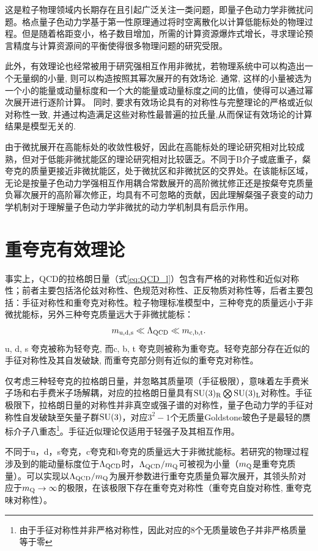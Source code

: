 这是粒子物理领域内长期存在且引起广泛关注一类问题，即量子色动力学非微扰问题。格点量子色动力学基于第一性原理通过将时空离散化以计算低能标处的物理过程。但是随着格距变小，格子数目增加，所需的计算资源爆炸式增长，寻求理论预言精度与计算资源间的平衡使得很多物理问题的研究受限。

此外，有效理论也经常被用于研究强相互作用非微扰，若物理系统中可以构造出一个无量纲的小量, 则可以构造按照其幂次展开的有效场论. 通常, 这样的小量被选为一个小的能量或动量标度和一个大的能量或动量标度之间的比值，使得可以通过幂次展开进行逐阶计算。 同时, 要求有效场论具有的对称性与完整理论的严格或近似对称性一致, 并通过构造满足这些对称性最普遍的拉氏量,从而保证有效场论的计算结果是模型无关的.

由于微扰展开在高能标处的收敛性极好，因此在高能标处的理论研究相对比较成熟，但对于低能非微扰能区的理论研究相对比较匮乏。不同于B介子或底重子，粲夸克的质量更接近非微扰能区，处于微扰区和非微扰区的交界处。在该能标区域，无论是按量子色动力学强相互作用耦合常数展开的高阶微扰修正还是按粲夸克质量负幂次展开的高阶幂次修正，均具有不可忽略的贡献，因此理解粲强子衰变的动力学机制对于理解量子色动力学非微扰的动力学机制具有启示作用。
\section{重夸克有效理论}
事实上，QCD的拉格朗日量（式\eqref{eq:QCD_l}）包含有严格的对称性和近似对称性；前者主要包括洛伦兹对称性、色规范对称性、正反物质对称性等，后者主要包括：手征对称性和重夸克对称性。粒子物理标准模型中，三种夸克的质量远小于非微扰能标，另外三种夸克质量远大于非微扰能标：
\begin{equation}
    m_{\mathrm{u, d, s}} \ll \Lambda_{\mathrm{QCD}} \ll m_{\mathrm{c, b, t}} .
    \end{equation}
 u, d, s 夸克被称为轻夸克, 而c, b, t 夸克则被称为重夸克。轻夸克部分存在近似的手征对称性及其自发破缺, 而重夸克部分则有近似的重夸克对称性。

 仅考虑三种轻夸克的拉格朗日量，并忽略其质量项（手征极限），意味着左手费米子场和右手费米子场解耦，对应的拉格朗日量具有$\mathrm{SU}(3)_{\mathrm{R}}\bigotimes\mathrm{SU}(3)_{\mathrm{L}}$对称性。手征极限下，拉格朗日量的对称性并非真空或强子谱的对称性，量子色动力学的手征对称性自发破缺至矢量子群$\mathrm{SU(3)}$，对应$3^2-1$个无质量Goldstone玻色子是最轻的赝标介子八重态\footnote{由于手征对称性并非严格对称性，因此对应的8个无质量玻色子并非严格质量等于零}。手征近似理论仅适用于轻强子及其相互作用。

 不同于u，d，s夸克，c夸克和b夸克的质量远大于非微扰能标。若研究的物理过程涉及到的能动量标度位于$\Lambda_{\mathrm{QCD}}$时，$\Lambda_{\mathrm{QCD}}/m_{\mathrm{Q}}$可被视为小量（$m_{\mathrm{Q}}$是重夸克质量）。可以实现以$\Lambda_{\mathrm{QCD}}/m_{\mathrm{Q}}$为展开参数进行重夸克质量负幂次展开，其领头阶对应于$m_{\mathrm{Q}}\to\infty$的极限，在该极限下存在重夸克对称性（重夸克自旋对称性, 重夸克味对称性）。

